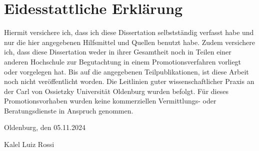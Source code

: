 \chapter*{Eidesstattliche Erklärung}

Hiermit versichere ich, dass ich diese Dissertation selbstständig verfasst habe und nur die hier angegebenen Hilfsmittel und Quellen benutzt habe. Zudem versichere ich, dass diese Dissertation weder in ihrer Gesamtheit noch in Teilen einer anderen Hochschule zur Begutachtung in einem Promotionsverfahren vorliegt oder vorgelegen hat. Bis auf die angegebenen Teilpublikationen, ist diese Arbeit noch nicht veröffentlicht worden. Die Leitlinien guter wissenschaftlicher Praxis an der Carl von Ossietzky Universität Oldenburg wurden befolgt. Für dieses Promotionsvorhaben wurden keine kommerziellen Vermittlungs- oder Beratungsdienste in Anspruch genommen.

\vspace{4cm}

Oldenburg, den 05.11.2024

Kalel Luiz Rossi
